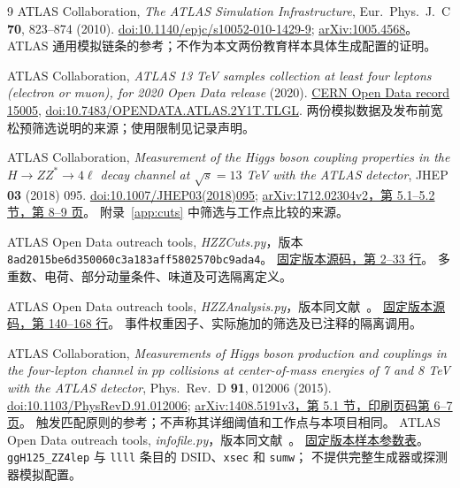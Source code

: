 \documentclass[11pt,a4paper,fontset=fandol,scheme=plain]{ctexart}
\begin{document}
\begingroup
\small
\renewcommand{\refname}{本报告参考文献}
\begin{thebibliography}{9}
ATLAS Collaboration, \emph{The ATLAS Simulation Infrastructure},
Eur.~Phys.~J.~C \textbf{70}, 823--874 (2010).
\href{https://doi.org/10.1140/epjc/s10052-010-1429-9}{doi:10.1140/epjc/s10052-010-1429-9};
\href{https://arxiv.org/abs/1005.4568}{arXiv:1005.4568}。
ATLAS 通用模拟链条的参考；不作为本文两份教育样本具体生成配置的证明。

ATLAS Collaboration, \emph{ATLAS 13 TeV samples collection at least four leptons
(electron or muon), for 2020 Open Data release} (2020).
\href{https://opendata.cern.ch/record/15005}{CERN Open Data record 15005},
\href{https://doi.org/10.7483/OPENDATA.ATLAS.2Y1T.TLGL}{doi:10.7483/OPENDATA.ATLAS.2Y1T.TLGL}.
两份模拟数据及发布前宽松预筛选说明的来源；使用限制见记录声明。

ATLAS Collaboration, \emph{Measurement of the Higgs boson coupling properties in
the $H\to ZZ^*\to4\ell$ decay channel at $\sqrt{s}=13$ TeV with the ATLAS detector},
JHEP \textbf{03} (2018) 095.
\href{https://doi.org/10.1007/JHEP03(2018)095}{doi:10.1007/JHEP03(2018)095};
\href{https://arxiv.org/pdf/1712.02304v2#page=8}{arXiv:1712.02304v2，第 5.1--5.2 节，第 8--9 页}。
附录~\ref{app:cuts} 中筛选与工作点比较的来源。

ATLAS Open Data outreach tools, \emph{HZZCuts.py}，版本
\nolinkurl{8ad2015be6d350060c3a183aff5802570bc9ada4}。
\href{https://github.com/atlas-outreach-data-tools/atlas-outreach-Python-uproot-framework-13tev/blob/8ad2015be6d350060c3a183aff5802570bc9ada4/HZZCuts.py#L2-L33}{固定版本源码，第 2--33 行}。
多重数、电荷、部分动量条件、味道及可选隔离定义。

ATLAS Open Data outreach tools, \emph{HZZAnalysis.py}，版本同文献~\cite{HZZCuts}。
\href{https://github.com/atlas-outreach-data-tools/atlas-outreach-Python-uproot-framework-13tev/blob/8ad2015be6d350060c3a183aff5802570bc9ada4/HZZAnalysis.py#L140-L168}{固定版本源码，第 140--168 行}。
事件权重因子、实际施加的筛选及已注释的隔离调用。

ATLAS Collaboration, \emph{Measurements of Higgs boson production and couplings
in the four-lepton channel in $pp$ collisions at center-of-mass energies of
7 and 8 TeV with the ATLAS detector}, Phys.~Rev.~D \textbf{91}, 012006 (2015).
\href{https://doi.org/10.1103/PhysRevD.91.012006}{doi:10.1103/PhysRevD.91.012006};
\href{https://arxiv.org/pdf/1408.5191v3#page=7}{arXiv:1408.5191v3，第 5.1 节，印刷页码第 6--7 页}。
触发匹配原则的参考；不声称其详细阈值和工作点与本项目相同。
ATLAS Open Data outreach tools, \emph{infofile.py}，版本同文献~\cite{HZZCuts}。
\href{https://github.com/atlas-outreach-data-tools/atlas-outreach-Python-uproot-framework-13tev/blob/8ad2015be6d350060c3a183aff5802570bc9ada4/infofile.py}{固定版本样本参数表}。
\texttt{ggH125\_ZZ4lep} 与 \texttt{llll} 条目的 DSID、\texttt{xsec} 和 \texttt{sumw}；
不提供完整生成器或探测器模拟配置。
\end{thebibliography}
\endgroup
\end{document}
